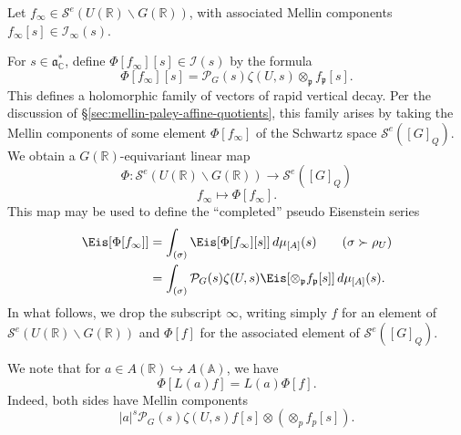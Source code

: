 Let $f_\infty \in \mathcal{S}^e(U(\mathbb{R}) \backslash G(\mathbb{R}))$, with associated Mellin components $f_\infty[s] \in \mathcal{I}_\infty(s)$.

For $s \in \mathfrak{a}_{\mathbb{C}}^*$, define $\Phi[f_\infty][s] \in \mathcal{I}(s)$ by the formula 
\begin{equation}\label{eq:phis-:=-qn}
  \Phi[f_\infty][s] = \mathcal{P}_G(s) \zeta(U,s) \otimes_{\mathfrak{p}} f_\mathfrak{p}[s].
\end{equation}
This defines a holomorphic family of vectors of rapid vertical decay.  Per the discussion of \S\ref{sec:mellin-paley-affine-quotients}, this family arises by taking the Mellin components of some element $\Phi[f_\infty]$ of the Schwartz space $\mathcal{S}^e([G]_Q)$.  We obtain a $G(\mathbb{R})$-equivariant linear map
\begin{equation*}
  \Phi : \mathcal{S}^e(U(\mathbb{R}) \backslash G(\mathbb{R})) \rightarrow \mathcal{S}^e([G]_Q)
\end{equation*}
\begin{equation*}
  f_\infty \mapsto \Phi[f_\infty].
\end{equation*}
This map may be used to define the ``completed'' pseudo Eisenstein series
\begin{align*}
  \Eis[\Phi[f_\infty]]
  &= \int_{(\sigma)} \Eis[\Phi[f_\infty][s]] \, d \mu_{[A]}(s)
    \quad \quad (\sigma \succ \rho_U) \\
  &= \int_{(\sigma)} \mathcal{P}_G(s) \zeta(U,s)
    \Eis[\otimes_{\mathfrak{p}} f_\mathfrak{p}[s]] \, d \mu_{[A]}(s).
\end{align*}
In what follows, we drop the subscript $\infty$, writing simply $f$ for an element of $\mathcal{S}^e(U(\mathbb{R}) \backslash G(\mathbb{R}))$ and $\Phi[f]$ for the associated element of $\mathcal{S}^e([G]_Q)$.

We note that for $a \in A(\mathbb{R}) \hookrightarrow A(\mathbb{A})$, we have
\begin{equation*}
  \Phi[L(a) f] = L(a) \Phi[f].
\end{equation*}
Indeed, both sides have Mellin components
\begin{equation*}
  |a|^s \mathcal{P}_G(s) \zeta(U,s) f[s] \otimes (\otimes_p f_p[s]).
\end{equation*}

